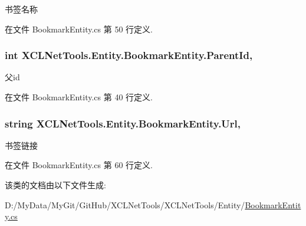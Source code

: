 书签名称 



在文件 Bookmark\-Entity.\-cs 第 50 行定义.

\hypertarget{class_x_c_l_net_tools_1_1_entity_1_1_bookmark_entity_afd3c2002aa8d5edeac06f6ef32ba7454}{
\subsubsection[{Parent\-Id}]{\setlength{\rightskip}{0pt plus 5cm}int X\-C\-L\-Net\-Tools.\-Entity.\-Bookmark\-Entity.\-Parent\-Id\hspace{0.3cm}{\ttfamily [get]}, {\ttfamily [set]}}}\label{class_x_c_l_net_tools_1_1_entity_1_1_bookmark_entity_afd3c2002aa8d5edeac06f6ef32ba7454}


父id 



在文件 Bookmark\-Entity.\-cs 第 40 行定义.

\hypertarget{class_x_c_l_net_tools_1_1_entity_1_1_bookmark_entity_a88ebfe2441fd5804a82f5eaee1ce3232}{
\subsubsection[{Url}]{\setlength{\rightskip}{0pt plus 5cm}string X\-C\-L\-Net\-Tools.\-Entity.\-Bookmark\-Entity.\-Url\hspace{0.3cm}{\ttfamily [get]}, {\ttfamily [set]}}}\label{class_x_c_l_net_tools_1_1_entity_1_1_bookmark_entity_a88ebfe2441fd5804a82f5eaee1ce3232}


书签链接 



在文件 Bookmark\-Entity.\-cs 第 60 行定义.



该类的文档由以下文件生成\-:\begin{DoxyCompactItemize}
\item 
D\-:/\-My\-Data/\-My\-Git/\-Git\-Hub/\-X\-C\-L\-Net\-Tools/\-X\-C\-L\-Net\-Tools/\-Entity/\hyperlink{_bookmark_entity_8cs}{Bookmark\-Entity.\-cs}\end{DoxyCompactItemize}
